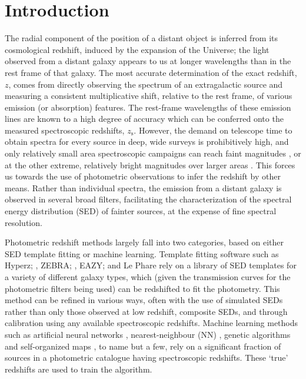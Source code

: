 \documentclass[useAMS,usenatbib,fleqn]{mn2e}
\begin{document}
\section{Introduction}
The radial component of the position of a distant object is inferred from its cosmological redshift, induced by the expansion of the Universe; the light observed from a distant galaxy appears to us at longer wavelengths than in the rest frame of that galaxy. The most accurate determination of the exact redshift, $z$, comes from directly observing the spectrum of an extragalactic source and measuring a consistent multiplicative shift, relative to the rest frame, of various emission (or absorption) features. The rest-frame wavelengths of these emission lines are known to a high degree of accuracy which can be conferred onto the measured spectroscopic redshifts, $z_\textrm{s}$. However, the demand on telescope time to obtain spectra for every source in deep, wide surveys is prohibitively high, and only relatively small area spectroscopic campaigns can reach faint magnitudes \citep[e.g.][]{Lilly2009,LeFevre2013,LeFevre2015}, or at the other extreme, relatively bright magnitudes over larger areas \citep[e.g.][]{2dfgrs,GAMA,SDSS3}.
This forces us towards the use of photometric observations to infer the redshift by other means. Rather than individual spectra, the emission from a distant galaxy is observed in several broad filters, facilitating the characterization of the spectral energy distribution (SED) of fainter sources, at the expense of fine spectral resolution.

Photometric redshift methods largely fall into two categories, based on either SED template fitting or machine learning. Template fitting software such as {\sc Hyperz}; \citep[][]{Hyperz}, {\sc ZEBRA}; \citep{ZEBRA}, {\sc EAZY}; \citep[][]{EAZY} and {\sc Le Phare} \citep[][]{Ilbert2006} rely on a library of SED templates for a variety of different galaxy types, which (given the transmission curves for the photometric filters being used) can be redshifted to fit the photometry. This method can be refined in various ways, often with the use of simulated SEDs rather than only those observed at low redshift, composite SEDs, and through calibration using any available spectroscopic redshifts. Machine learning methods such as artificial neural networks \citep[e.g. {\sc ANNz};][]{Firth2003,Collister04}, nearest-neighbour (NN) \citep{Ball2008}, genetic algorithms \citep[e.g.][]{Hogan2015} and self-organized maps \citep[][]{Geach2012}, to name but a few, rely on a significant fraction of sources in a photometric catalogue having spectroscopic redshifts. These `true' redshifts are used to train the algorithm. 
\end{document}
